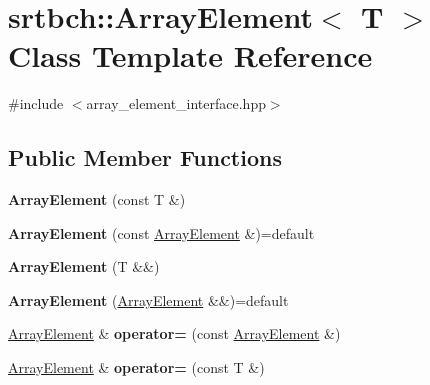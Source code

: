 \hypertarget{classsrtbch_1_1ArrayElement}{}\section{srtbch\+:\+:Array\+Element$<$ T $>$ Class Template Reference}
\label{classsrtbch_1_1ArrayElement}


{\ttfamily \#include $<$array\+\_\+element\+\_\+interface.\+hpp$>$}

\subsection*{Public Member Functions}
\begin{DoxyCompactItemize}
\item 
\mbox{\label{classsrtbch_1_1ArrayElement_abdfc84152b0f266f4139362615ec0803}} 
{\bfseries Array\+Element} (const T \&)
\item 
\mbox{\label{classsrtbch_1_1ArrayElement_a9d70dd65d20a719675566090ea1754e5}} 
{\bfseries Array\+Element} (const \hyperlink{classsrtbch_1_1ArrayElement}{Array\+Element} \&)=default
\item 
\mbox{\label{classsrtbch_1_1ArrayElement_a1403ca6649bd76437e3c3bcc6305a721}} 
{\bfseries Array\+Element} (T \&\&)
\item 
\mbox{\label{classsrtbch_1_1ArrayElement_a53c56d060446c0bc7c70919cbdf2f873}} 
{\bfseries Array\+Element} (\hyperlink{classsrtbch_1_1ArrayElement}{Array\+Element} \&\&)=default
\item 
\mbox{\label{classsrtbch_1_1ArrayElement_a3f72f285b18bfd8bc56ffcfe49404512}} 
\hyperlink{classsrtbch_1_1ArrayElement}{Array\+Element} \& {\bfseries operator=} (const \hyperlink{classsrtbch_1_1ArrayElement}{Array\+Element} \&)
\item 
\mbox{\label{classsrtbch_1_1ArrayElement_ac10899382bfda11d2413a503969ec8d2}} 
\hyperlink{classsrtbch_1_1ArrayElement}{Array\+Element} \& {\bfseries operator=} (const T \&)
\item 
\mbox{\label{classsrtbch_1_1ArrayElement_a7fc14c499cf551e61da28572d059f23f}} 

\end{DoxyCompactItemize}
